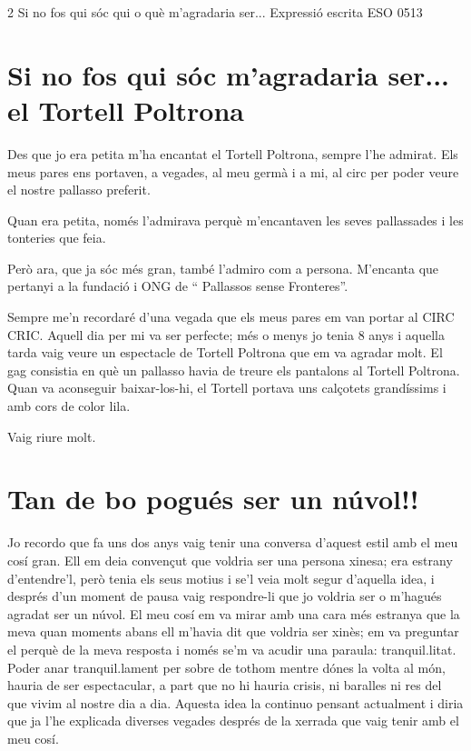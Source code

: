 \begin{news}
{2} %
{Si no fos qui sóc qui o què m'agradaria ser...}
{Expressió escrita}
{ESO}
{0513} %

\section*{Si no fos qui sóc m'agradaria ser... el Tortell Poltrona}

Des que jo era petita m'ha encantat el Tortell Poltrona, sempre l'he admirat. Els meus pares ens portaven, a vegades, al meu germà i a mi,  al circ per poder veure el nostre pallasso preferit.

Quan era petita, només l'admirava perquè m'encantaven les seves pallassades i les tonteries que feia.

Però ara, que ja sóc més gran, també l'admiro com a persona. M'encanta que pertanyi a la fundació i ONG de “ Pallassos sense Fronteres”.

Sempre me'n recordaré d'una vegada que els meus pares em van portar al CIRC CRIC. Aquell dia per  mi va ser perfecte; més o menys jo tenia 8 anys i aquella tarda vaig veure un espectacle de Tortell Poltrona que em va agradar molt. El gag consistia en què un pallasso havia de treure els pantalons al Tortell Poltrona. Quan va aconseguir baixar-los-hi, el Tortell portava uns calçotets grandíssims i amb cors de color lila. 

Vaig riure molt. 


\section*{Tan de bo pogués ser un núvol!!}

Jo recordo que fa uns dos anys vaig tenir una conversa d’aquest estil amb el meu cosí gran. Ell em deia convençut que voldria ser una persona xinesa; era estrany d’entendre’l, però tenia els seus motius i se’l veia molt segur d’aquella idea, i després d’un moment de pausa vaig respondre-li que jo voldria ser o m’hagués agradat ser un núvol. El meu cosí em va mirar amb una cara més estranya que la meva quan moments abans ell m’havia dit que voldria ser xinès; em va preguntar el perquè de la meva resposta i només se’m va acudir una paraula: tranquil.litat. Poder anar tranquil.lament per sobre de tothom mentre dónes la volta al món, hauria de ser espectacular, a part que no hi hauria crisis, ni baralles ni res del que vivim al nostre dia a dia. Aquesta idea la continuo pensant  actualment i diria que ja l’he explicada diverses vegades després de la xerrada que vaig tenir amb el meu cosí.



\end{news}
